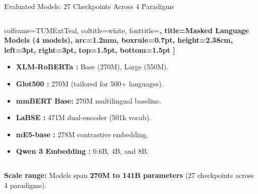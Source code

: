 \documentclass[
  english,
  aspectratio=169,
]{tumbeamer}
\begin{document}
\begin{frame}{Evaluated Models: 27 Checkpoints Across 4 Paradigms}
\begin{columns}[T]
\begin{column}{0.485\textwidth}
\begin{tcolorbox}
        colframe=TUMExtTeal,
        coltitle=white,
        fonttitle=\bfseries\scriptsize,
        title=Masked Language Models (4 models),
        arc=1.2mm, boxrule=0.7pt,
        height=2.38cm,
        left=3pt, right=3pt, top=1.5pt, bottom=1.5pt
      ]
        \vspace{-0.25em}
        \setlength{\leftmargini}{9pt}
        \begin{itemize}\scriptsize \setlength{\itemsep}{0.2pt}
          \item \textbf{XLM-RoBERTa :} Base (270M), Large (550M).
          \item \textbf{Glot500 :} 270M (tailored for 500+ languages).
          \item \textbf{mmBERT Base:} 270M multilingual baseline.
        \end{itemize}
      \end{tcolorbox}
      \vspace{0.12em}
      \begin{tcolorbox}[
        colback=TUMExtForest!5,
        colframe=TUMExtForest,
        coltitle=white,
        fonttitle=\bfseries\scriptsize,
        title=Sentence Embedding Models (5 models),
        arc=1.2mm, boxrule=0.7pt,
        height=2.38cm,
        left=3pt, right=3pt, top=1.5pt, bottom=1.5pt
      ]
        \vspace{-0.25em}
        \setlength{\leftmargini}{9pt}
        \begin{itemize}\scriptsize \setlength{\itemsep}{0.2pt}
          \item \textbf{LaBSE :} 471M dual-encoder (501k vocab).
          \item \textbf{mE5-base :} 278M contrastive embedding.
          \item \textbf{Qwen 3 Embedding :} 0.6B, 4B, and 8B.
        \end{itemize}
      \end{tcolorbox}
    \end{column}
  \end{columns}
  \vspace{0.12em}
  \begin{takeawaybox}
    \textbf{Scale range:} Models span \textbf{270M to 141B parameters} (27 checkpoints across 4 paradigms).
  \end{takeawaybox}
\end{frame}
\end{document}
